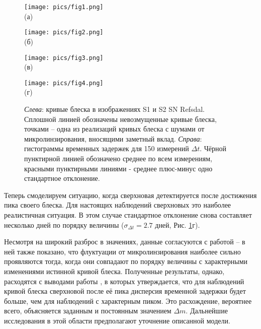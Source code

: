 \begin{figure}[H]
    \centering
	\begin{minipage}[h]{1.0\linewidth}
    \centering    
    	\texttt{[image: pics/fig1.png]} \\ \centering (а)  \\ 
	\end{minipage}
	\vfill
	\begin{minipage}[h]{1.0\linewidth}
	\centering
    	\texttt{[image: pics/fig2.png]} \\ \centering (б) \\
	\end{minipage}
	\vfill
	\begin{minipage}[h]{1.0\linewidth}
    \centering	
    	\texttt{[image: pics/fig3.png]} \\ \centering (в) \\
	\end{minipage}
	\vfill
	\begin{minipage}[h]{1.0\linewidth}
    \centering	
    	\texttt{[image: pics/fig4.png]} \\ \centering (г) \\
	\end{minipage}
	
	\caption{\textit{Слева}: кривые блеска в изображениях S1 и S2 SN Refsdal. Сплошной линией обозначены невозмущенные кривые блеска, точками -- одна из реализаций кривых блеска с шумами от микролинзирования, вносящими заметный вклад. \textit{Справа}: гистограммы временных задержек для 150 измерений $\Delta t$. Чёрной пунктирной линией обозначено среднее по всем измерениям, красными пунктирными линиями - среднее плюс-минус одно стандартное отклонение. \label{fig:proba}} 
\end{figure}
Теперь смоделируем ситуацию, когда сверхновая детектируется после достижения пика своего блеска. Для настоящих наблюдений сверхновых это наиболее реалистичная ситуация. В этом случае стандартное отклонение снова составляет несколько дней по порядку величины ($\sigma_{\Delta t}=2.7$ дней, Рис. \ref{fig:proba}г).

Несмотря на широкий разброс в значениях, данные согласуются с работой \cite{doblerkeeton2006} -- в ней также показано,  что флуктуации от микролинзирования наиболее сильно проявляются тогда, когда они совпадают по порядку величины с характерными изменениями истинной кривой блеска. Полученные результаты, однако, расходятся с выводами работы \cite{pierelrodney2019}, в которых утверждается, что для наблюдений кривой блеска сверхновой после её пика дисперсия временной задержки будет больше, чем для наблюдений с характерным пиком. Это расхождение, вероятнее всего, объясняется заданным и постоянным значением $\Delta m$. Дальнейшие исследования в этой области предполагают уточнение описанной модели.
